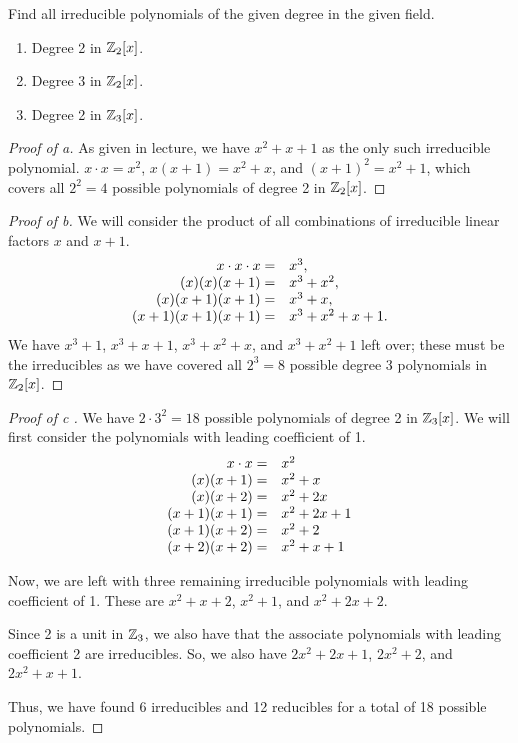 \documentclass[../hw5]{subfiles}
\begin{document}
\begin{problem}
Find all irreducible polynomials of the given degree in the given field.
\begin{enumerate}[label=\alph*)]
	\item Degree 2 in $\mathbb{Z}_2[x]$.
	\item Degree 3 in $\mathbb{Z}_2[x]$.
	\item Degree 2 in $\mathbb{Z}_3[x]$.
\end{enumerate}
\end{problem}
\begin{proof}[Proof of a]
	As given in lecture, we have $x^2 + x + 1$ as the only such irreducible polynomial.
	$x\cdot x = x^2$, $x(x+1)=x^2 + x$, and $(x + 1)^2=x^2 + 1$, which covers all $2^2=4$ possible polynomials of degree 2 in  $\mathbb{Z}_2[x]$.
\end{proof}
\begin{proof}[Proof of b]
	We will consider the product of all combinations of irreducible linear factors $x$  and $x+1$.
	\[\begin{array}{r l}
			x\cdot x\cdot x             = & x^3,               \\
			(x)(x)(x+1)          =        & x^3 + x^2,         \\
			(x)(x+1)(x+1)       =         & x^3 + x,           \\
			(x+1)(x+1)(x+1)    =          & x^3 + x^2 + x + 1. \\
		\end{array}\]
	We have $x^3 + 1$, $x^3 + x + 1$, $x^3 + x^2 + x$, and $x^3 + x^2 + 1$ left over;
	these must be the irreducibles as we have covered all $2^3=8$ possible degree 3 polynomials in $\mathbb{Z}_2[x]$.
\end{proof}
\begin{proof}[Proof of c ]
	We have $2\cdot 3^2=18$ possible polynomials of degree 2 in $\mathbb{Z}_3[x]$.
	We will first consider the polynomials with leading coefficient of 1.
	\[\begin{array}{r l}
			x\cdot x =   & x^2          \\
			(x)(x+1) =   & x^2 + x      \\
			(x)(x+2) =   & x^2 + 2x     \\
			(x+1)(x+1) = & x^2 + 2x + 1 \\
			(x+1)(x+2) = & x^2 +2       \\
			(x+2)(x+2)=  & x^2 +x  + 1  \\
		\end{array}\]

	Now, we are left with three remaining irreducible polynomials with leading coefficient of 1.
	These are $x^2 + x + 2$, $x^2 + 1$, and $x^2 + 2x + 2$.

	Since 2 is a unit in  $\mathbb{Z}_3$, we also have that the associate polynomials with leading coefficient 2 are irreducibles.
	So, we also have $2x^2 + 2x + 1$, $2x^2 + 2$, and $2x^2 + x + 1$.

	Thus, we have found 6 irreducibles and 12 reducibles for a total of 18 possible polynomials.
\end{proof}
\end{document}
